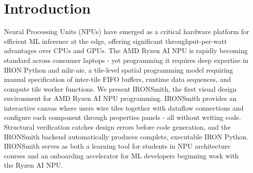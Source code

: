 \section{Introduction} \label{sec:intro}
\vspace{-3mm}

Neural Processing Units (NPUs) have emerged as a critical hardware platform for efficient ML inference at the edge, offering significant throughput-per-watt advantages over CPUs and GPUs. The AMD Ryzen AI NPU is rapidly becoming standard across consumer laptops - yet programming it requires deep expertise in IRON Python and mlir-aie, a tile-level spatial programming model requiring manual specification of inter-tile FIFO buffers, runtime data sequences, and compute tile worker functions. 
We present IRONSmith, the first visual design environment for AMD Ryzen AI NPU programming. IRONSmith provides an interactive canvas where users wire tiles together with dataflow connections and configure each component through properties panels - all without writing code. Structural verification catches design errors before code generation, and the IRONSmith backend automatically produces complete, executable IRON Python. IRONSmith serves as both a learning tool for students in NPU architecture courses and an onboarding accelerator for ML developers beginning work with the Ryzen AI NPU.
\vspace{-3mm}
